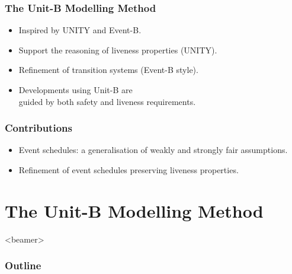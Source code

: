 \begin{frame}
  \frametitle{The Unit-B Modelling Method}

  \begin{itemize}
  \item Inspired by UNITY and Event-B.
    \medskip
  \item Support the reasoning of \alert{liveness properties} (UNITY).
    \medskip
  \item \alert{Refinement} of transition systems (Event-B style).
    \medskip
  \item Developments using Unit-B are \\
    \alert{guided by both safety and liveness requirements}.
  \end{itemize}
\end{frame}


\begin{frame}
  \frametitle{Contributions}

  \begin{itemize}
  \item Event schedules: a generalisation of weakly and strongly fair
    assumptions.
    \medskip
  \item Refinement of event schedules preserving liveness properties.
  \end{itemize}
\end{frame}



\section{The Unit-B Modelling Method}
\label{sec:unit-b-modelling}
\begin{frame}<beamer>
  \frametitle{Outline}
  \tableofcontents[currentsection]
\end{frame}


\newcommand{\iI}{I}
\newcommand{\predP}{P}
\newcommand{\predQ}{Q}
\newcommand{\predR}{R}




